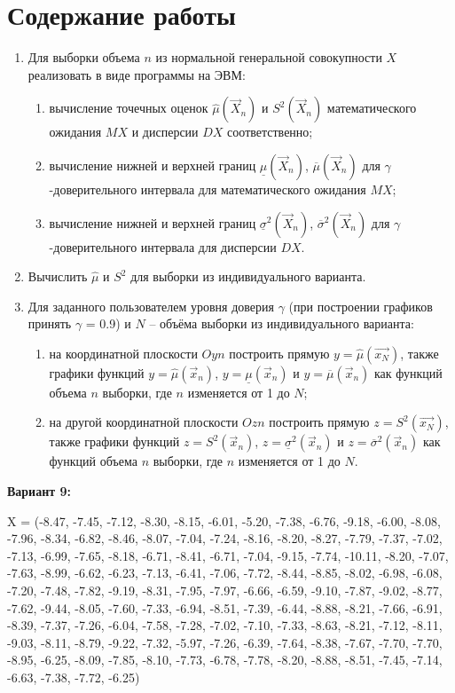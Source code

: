 \documentclass[12pt]{report}
\begin{document}
\section*{Содержание работы}
\begin{enumerate}
	\item Для выборки объема $n$ из нормальной генеральной совокупности $X$ реализовать в виде программы на ЭВМ:
	\begin{enumerate}
		\item вычисление точечных оценок $\hat\mu(\vec X_n)$ и $S^2(\vec X_n)$ математического ожидания $MX$ и дисперсии $DX$ соответственно;
		\item вычисление нижней и верхней границ $\underline\mu(\vec X_n)$, $\overline\mu(\vec X_n)$ для $\gamma$-доверительного интервала для математического ожидания $MX$;
		\item вычисление нижней и верхней границ $\underline\sigma^2(\vec X_n)$, $\overline\sigma^2(\vec X_n)$ для $\gamma$-доверительного интервала для дисперсии $DX$.
	\end{enumerate}
	\item Вычислить $\hat\mu$ и $S^2$ для выборки из индивидуального варианта.
	\item Для заданного пользователем уровня доверия $\gamma$ (при построении графиков принять $\gamma$ = 0.9) и $N$ – объёма выборки из индивидуального варианта:
	\begin{enumerate}
		\item на координатной плоскости $Oyn$ построить прямую $y = \hat\mu(\vec{x_N})$, также графики функций $y = \hat\mu(\vec x_n)$, $y = \underline\mu(\vec x_n)$ и $y = \overline\mu(\vec x_n)$ как функций объема $n$ выборки, где $n$ изменяется от 1 до $N$;
		\item на другой координатной плоскости $Ozn$ построить прямую $z = S^2(\vec{x_N})$, также графики функций $z = S^2(\vec x_n)$, $z = \underline\sigma^2(\vec x_n)$ и $z = \overline\sigma^2(\vec x_n)$ как функций объема $n$ выборки, где $n$ изменяется от 1 до $N$.
	\end{enumerate}
\end{enumerate}

\textbf{Вариант 9:}

X = (-8.47, -7.45, -7.12, -8.30, -8.15, -6.01, -5.20, -7.38, -6.76, -9.18, -6.00, -8.08, -7.96, -8.34, -6.82, -8.46, -8.07, -7.04, -7.24, -8.16, -8.20, -8.27, -7.79, -7.37, -7.02, -7.13, -6.99, -7.65, -8.18, -6.71, -8.41, -6.71, -7.04, -9.15, -7.74, -10.11, -8.20, -7.07, -7.63, -8.99, -6.62, -6.23, -7.13, -6.41, -7.06, -7.72, -8.44, -8.85, -8.02, -6.98, -6.08, -7.20, -7.48, -7.82, -9.19, -8.31, -7.95, -7.97, -6.66, -6.59, -9.10, -7.87, -9.02, -8.77, -7.62, -9.44, -8.05, -7.60, -7.33, -6.94, -8.51, -7.39, -6.44, -8.88, -8.21, -7.66, -6.91, -8.39, -7.37, -7.26, -6.04, -7.58, -7.28, -7.02, -7.10, -7.33, -8.63, -8.21, -7.12, -8.11, -9.03, -8.11, -8.79, -9.22, -7.32, -5.97, -7.26, -6.39, -7.64, -8.38, -7.67, -7.70, -7.70, -8.95, -6.25, -8.09, -7.85, -8.10, -7.73, -6.78, -7.78, -8.20, -8.88, -8.51, -7.45, -7.14, -6.63, -7.38, -7.72, -6.25)
\end{document}
